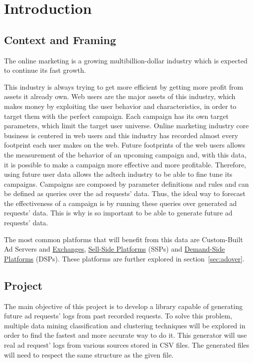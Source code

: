 \chapter{Introduction} \label{chap:intro}


\section{Context and Framing} \label{sec:context}

The online marketing is a growing multibillion-dollar industry \cite{PricewaterhouseCoopers2013}
which is expected to continue its fast growth.\cite{PricewaterhouseCoopers2013a}

This industry is always trying to get more efficient by getting more profit from assets it already own. 
Web users are the major assets of this industry, which makes money by exploiting the user behavior and characteristics, in order to target them with the
perfect campaign. Each campaign has its own target parameters, which limit the target user universe.
Online marketing industry core business is centered in web users and this industry has recorded almost every footprint each user makes on the web.
Future footprints of the web users allows the measurement of the behavior of an upcoming campaign and, with this data, it is possible to make a campaign more
effective and more profitable. Therefore, using future user data allows the adtech industry to be able to fine tune its campaigns. 
Campaigns are composed by parameter definitions and rules and can be defined as
queries over the ad requests' data. Thus, the ideal way to forecast the effectiveness
of a campaign is by running these queries over generated ad requests' data. This
is why is so important to be able to generate future ad requests' data.

The most common platforms that will benefit from this data are Custom-Built Ad
Servers and \hyperref[itm:adex]{Exchanges}, \hyperref[itm:ssp]{Sell-Side Platforms} (SSPs) and
\hyperref[itm:dsp]{Demand-Side Platforms}
(DSPs). These platforms are further explored in section~\ref{sec:adover}.


\section{Project} \label{sec:proj}

The main objective of this project is to develop a library capable of generating
future ad requests' logs from past recorded requests.
To solve this problem, multiple data mining classification and clustering
techniques will be explored in order to find the fastest and more accurate way
to do it. 
This generator will use real ad request' logs from various sources stored in CSV files.
The generated files will need to respect the same structure as the given file.

